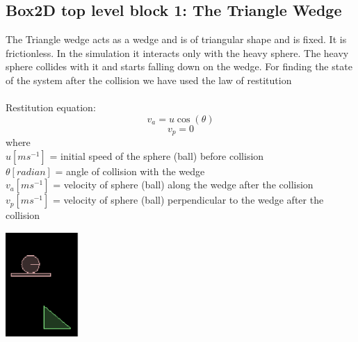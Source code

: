 \documentclass[english, 11pt]{article}
\begin{document}
\subsection{Box2D top level block 1: The Triangle Wedge}
The Triangle wedge acts as a wedge and is of triangular shape and is fixed. It is frictionless.
In the simulation it interacts only with the heavy sphere. The heavy sphere collides with it and starts falling down on the wedge.
For finding the state of the system after the collision we have used the law of restitution \cite{book1}\\
\\
Restitution equation: 
 \begin{equation}
 v_a = u \cos(\theta)
 \end{equation}
 \begin{equation}
 v_p = 0
 \end{equation}
 where\\
 $u[{m}{s^{-1}}]$ = initial speed of the sphere (ball) before collision\\
 $\theta[{radian}]$ = angle of collision with the wedge\\
 $v_a[{m}{s^{-1}}]$ = velocity of sphere (ball) along the wedge after the collision\\
 $v_p[{m}{s^{-1}}]$ = velocity of sphere (ball) perpendicular to the wedge after the collision
	\begin{center}
		\includegraphics[height=150px]{dominos1}
	\end{center}
\end{document}
